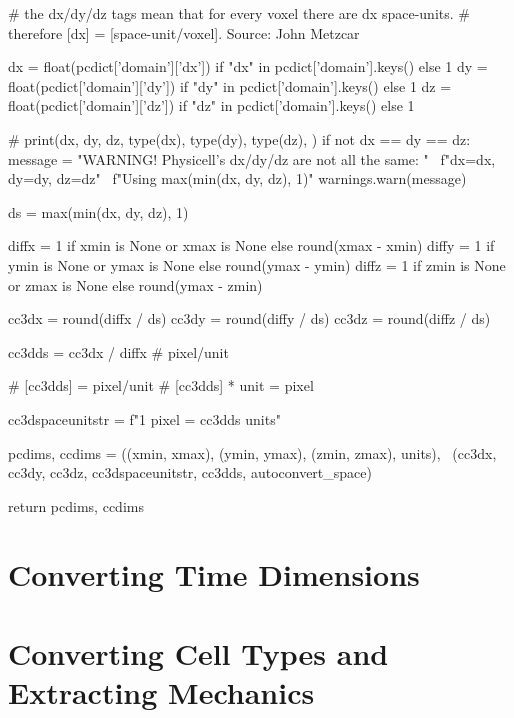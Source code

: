 \begin{python}
    # the dx/dy/dz tags mean that for every voxel there are dx space-units.
    # therefore [dx] = [space-unit/voxel]. Source: John Metzcar

    dx = float(pcdict['domain']['dx']) if "dx" in pcdict['domain'].keys() else 1
    dy = float(pcdict['domain']['dy']) if "dy" in pcdict['domain'].keys() else 1
    dz = float(pcdict['domain']['dz']) if "dz" in pcdict['domain'].keys() else 1

    # print(dx, dy, dz, type(dx), type(dy), type(dz), )
    if not dx == dy == dz:
        message = "WARNING! Physicell's dx/dy/dz are not all the same: " \
                  f"dx={dx}, dy={dy}, dz={dz}\n" \
                  f"Using {max(min(dx, dy, dz), 1)}"
        warnings.warn(message)

    ds = max(min(dx, dy, dz), 1)

    diffx = 1 if xmin is None or xmax is None else round(xmax - xmin)
    diffy = 1 if ymin is None or ymax is None else round(ymax - ymin)
    diffz = 1 if zmin is None or zmax is None else round(ymax - zmin)

    cc3dx = round(diffx / ds)
    cc3dy = round(diffy / ds)
    cc3dz = round(diffz / ds)

    cc3dds = cc3dx / diffx  # pixel/unit

    # [cc3dds] = pixel/unit
    # [cc3dds] * unit = pixel

    cc3dspaceunitstr = f"1 pixel = {cc3dds} {units}"

    pcdims, ccdims = ((xmin, xmax), (ymin, ymax), (zmin, zmax), units), \
                     (cc3dx, cc3dy, cc3dz, cc3dspaceunitstr, cc3dds, autoconvert_space)

    return pcdims, ccdims
\end{python}


\section{Converting Time Dimensions}\label{appendix:trans:time-conv}

\section{Converting Cell Types and Extracting Mechanics}\label{appendix:trans:cell-types-conv}

